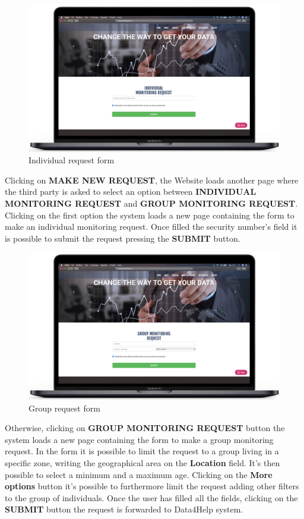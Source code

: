 \begin{enumerate}
\begin{figure}[H]
        \centering
          \includegraphics[scale = 0.33]{Images/Mockups/IndividualRequest.jpg}
          	\caption{Individual request form}
\end{figure}
Clicking on \textbf{MAKE NEW REQUEST}, the Website loads another page where the third party is asked to select an option between \textbf{INDIVIDUAL MONITORING REQUEST} and \textbf{GROUP MONITORING REQUEST}. Clicking on the first option the system loads a new page containing the form to make an individual monitoring request. Once filled the security number's field it is possible to submit the request pressing the \textbf{SUBMIT} button.
\clearpage

\begin{figure}[H]
        \centering
          \includegraphics[scale = 0.33]{Images/Mockups/GroupRequest.jpg}
          	\caption{Group request form}
\end{figure}
Otherwise, clicking on \textbf{GROUP MONITORING REQUEST} button the system loads a new page containing the form to make a group monitoring request. In the form it is possible to limit the request to a group living in a specific zone, writing the geographical area on the \textbf{Location} field. It's then possible to select a minimum and a maximum age. Clicking on the \textbf{More options} button it's possible to furthermore limit the request adding other filters to the group of individuals. Once the user has filled all the fields, clicking on the \textbf{SUBMIT} button the request is forwarded to Data4Help system.
\clearpage


\end{enumerate}
